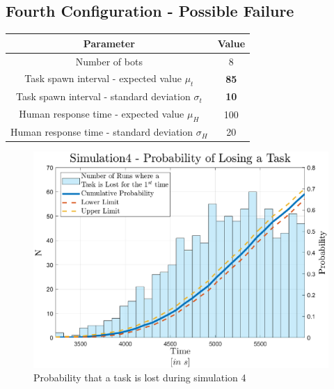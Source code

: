 \documentclass[10pt,a4paper]{article}
\begin{document}
		\subsection{Fourth Configuration - Possible Failure}
			\begin{center}
				\begin{tabular}{ |c|c|}
					\hline
					Parameter & Value\\
					\hline
					\hline
					Number of bots & 8\\
					\hline
					Task spawn interval - expected value $\mu_t$ & \textbf{85}\\
					\hline					
					Task spawn interval - standard deviation $\sigma_t$ & \textbf{10}\\
					\hline
					Human response time - expected value $\mu_H$ & 100\\
					\hline					
					Human response time - standard deviation $\sigma_H$ & 20\\
					\hline
				\end{tabular}
			\end{center}
			\begin{figure}[H]
				\centering
					\includegraphics[scale = 0.6]{Images/Simulation4}
					\caption{Probability that a task is lost during simulation 4}
					\label{fig:sim4}
			\end{figure}
	
\end{document}
